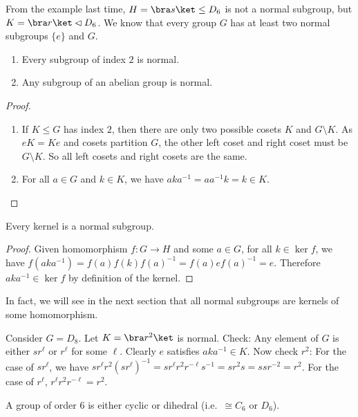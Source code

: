 \documentclass[a4paper]{article}
\begin{document}
From the example last time, $H=\bra s\ket\leq D_6$ is not a normal subgroup, but $K=\bra r\ket \lhd D_6$. We know that every group $G$ has at least two normal subgroups $\{e\}$ and $G$.

\begin{lemma}\leavevmode
  \begin{enumerate}
    \item Every subgroup of index $2$ is normal.
    \item Any subgroup of an abelian group is normal.
  \end{enumerate}
\end{lemma}

\begin{proof}\leavevmode
  \begin{enumerate}
    \item If $K\leq G$ has index $2$, then there are only two possible cosets $K$ and $G\setminus K$. As $eK = Ke$ and cosets partition $G$, the other left coset and right coset must be $G\setminus K$. So all left cosets and right cosets are the same.
    \item For all $a\in G$ and $k\in K$, we have $aka^{-1} = aa^{-1}k = k\in K$.\qedhere
  \end{enumerate}
\end{proof}
\begin{prop}
  Every kernel is a normal subgroup.
\end{prop}

\begin{proof}
  Given homomorphism $f:G\rightarrow H$ and some $a\in G$, for all $k\in \ker f$, we have $f(aka^{-1}) = f(a)f(k)f(a)^{-1} = f(a)ef(a)^{-1} = e$. Therefore $aka^{-1}\in\ker f$ by definition of the kernel.
\end{proof}

In fact, we will see in the next section that all normal subgroups are kernels of some homomorphism.

\begin{eg}
  Consider $G = D_8$. Let $K = \bra r^2\ket$ is normal. Check: Any element of $G$ is either $sr^\ell$ or $r^\ell$ for some $\ell$. Clearly $e$ satisfies $aka^{-1}\in K$. Now check $r^2$: For the case of $sr^\ell$, we have $sr^\ell r^2(sr^\ell)^{-1} = sr^\ell r^2 r^{-\ell}s^{-1} = sr^2 s = ssr^{-2} = r^2$. For the case of $r^\ell$, $r^\ell r^2r^{-\ell} = r^2$.
\end{eg}

\begin{prop}
  A group of order $6$ is either cyclic or dihedral (i.e.\ $\cong C_6$ or $D_6$).
\end{prop}
\end{document}
